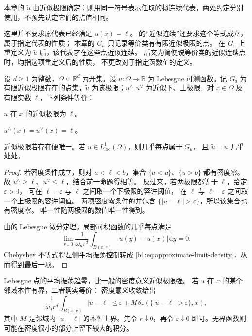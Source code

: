 本章的 \(\widetilde u\) 由近似极限确定；则用同一符号表示任取的拟连续代表，两处约定分别使用，不预先认定它们的点值相同。

\ProseParagraphBreak

这里并不要求原代表已经满足 \(u(x)=\ell\)。
的“近似连续”还要求这个等式成立，属于指定代表的性质；
本章的 \(G_u\) 只记录等价类有有限近似极限的点。
在 \(G_u\) 上重定义为 \(\widetilde u\) 后，该代表才在这些点近似连续。
后文为简便说等价类的近似连续点时，均指这项重定义后的性质，
不更改对于指定函数值的定义。

\begin{proposition}\label{b1:prop:approximate-continuity-characterization}
设 \(d\ge1\) 为整数，\(\Omega\subseteq\mathbb R^d\) 为开集。设 \(u:\Omega\to\mathbb R\) 为 Lebesgue 可测函数。记 \(G_u\) 为有限近似极限存在的点集，\(\widetilde u\) 为该极限；\(u^\wedge,u^\vee\) 为近似下、上极限。对 \(x\in\Omega\) 及有限实数 \(\ell\)，下列条件等价：
\begin{equivalences}
 \item\label{b1:item:approximate-limit-density}
 \(u\) 在 \(x\) 的近似极限为 \(\ell\)。
 \item\label{b1:item:approximate-limits-equal}
 \(u^\wedge(x)=u^\vee(x)=\ell\)。
\end{equivalences}
近似极限若存在便唯一。若 \(u\in L^1_{\mathrm{loc}}(\Omega)\)，则几乎每点属于 \(G_u\)，
且 \(\widetilde u=u\) 几乎处处。
\end{proposition}
\begin{proof}
若密度条件成立，则对 \(a<\ell<b\)，集合 \(\{u<a\}\)、\(\{u>b\}\) 都有密度零。
故 \(u^\wedge\ge\ell\)、\(u^\vee\le\ell\)，结合前一命题得相等。
反过来，若两极限都等于 \(\ell\)，给定 \(\varepsilon>0\)，
可在 \(\ell-\varepsilon\) 与 \(\ell\) 之间取一个下极限的容许阈值，
在 \(\ell\) 与 \(\ell+\varepsilon\) 之间取一个上极限的容许阈值。
两项密度零条件的并包含 \(\{|u-\ell|>\varepsilon\}\)，所以该集合也有密度零。
唯一性随两极限的数值唯一性得到。

由的 Lebesgue 微分定理，局部可积函数的几乎每点满足
\[
 \lim_{r\downarrow0}\frac1{\omega_dr^d}\int_{B(x,r)}|u(y)-u(x)|\,\mathrm dy=0.
\]
Chebyshev 不等式将左侧平均振荡控制转成%
\eqref{b1:eq:approximate-limit-density}，从而得到最后一项。
\end{proof}

Lebesgue 点的平均振荡趋零，比一般的密度意义近似极限强。
若 \(u\) 在 \(x\) 的某个邻域本性有界，二者确实等价：
密度意义收敛给出
\[
 \frac1{\omega_dr^d}\int_{B(x,r)}|u-\ell|
 \le\varepsilon+M\,\theta_r(\{|u-\ell|>\varepsilon\},x),
\]
其中 \(M\) 是邻域内 \(|u-\ell|\) 的本性上界。先令 \(r\downarrow0\)，再令
\(\varepsilon\downarrow0\) 即可。无界函数则可能在密度很小的部分上留下较大的积分。

